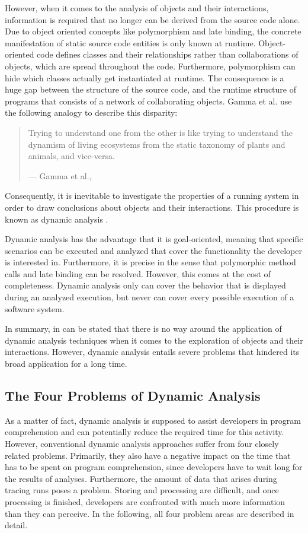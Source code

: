 However, when it comes to the analysis of objects and their interactions, information is required that no longer can be derived from the source code alone.
Due to object oriented concepts like polymorphism and late binding, the concrete manifestation of static source code entities is only known at runtime.
Object-oriented code defines classes and their relationships rather than collaborations of objects, which are spread throughout the code.
Furthermore, polymorphism can hide which classes actually get instantiated at runtime.
The consequence is a huge gap between the structure of the source code, and the runtime structure of programs that consists of a network of collaborating objects.
Gamma et al. use the following analogy to describe this disparity:

\begin{quote}
Trying to understand one from the other is like trying to understand the dynamism of living ecosystems from the static taxonomy of plants and animals, and vice-versa.
\par\raggedleft--- \textup{Gamma et al.}, \cite{gamma_design_1995}
\end{quote}

Consequently, it is inevitable to investigate the properties of a running system in order to draw conclusions about objects and their interactions.
This procedure is known as dynamic analysis \cite{bell_concept_1999}.

Dynamic analysis has the advantage that it is goal-oriented, meaning that specific scenarios can be executed and analyzed that cover the functionality the developer is interested in.
Furthermore, it is precise in the sense that polymorphic method calls and late binding can be resolved.
However, this comes at the cost of completeness.
Dynamic analysis only can cover the behavior that is displayed during an analyzed execution, but never can cover every possible execution of a software system.

In summary, in can be stated that there is no way around the application of dynamic analysis techniques when it comes to the exploration of objects and their interactions.
However, dynamic analysis entails severe problems that hindered its broad application for a long time.

\subsection{The Four Problems of Dynamic Analysis}
\label{ss:BackgroundAnalysisProblems}
As a matter of fact, dynamic analysis is supposed to assist developers in program comprehension and can potentially reduce the required time for this activity.
However, conventional dynamic analysis approaches suffer from four closely related problems.
Primarily, they also have a negative impact on the time that has to be spent on program comprehension, since developers have to wait long for the results of analyses.
Furthermore, the amount of data that arises during tracing runs poses a problem. 
Storing and processing are difficult, and once processing is finished, developers are confronted with much more information than they can perceive.
In the following, all four problem areas are described in detail.

